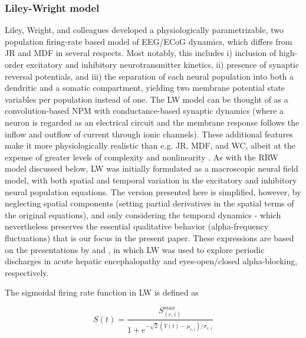\documentclass[12pt,twoside]{article}
\begin{document}
\subsubsection{Liley-Wright model}

Liley, Wright, and colleagues \citep{liley2001spatially} developed a physiologically parametrizable, two population firing-rate based model of EEG/ECoG dynamics, which differs from JR and MDF in several respects. Most notably, this includes i) inclusion of high-order excitatory and inhibitory neurotransmitter kinetics, ii) presence of synaptic reversal potentials, and iii) the separation of each neural population into both a dendritic and a somatic compartment, yielding two membrane potential state variables per population instead of one. The LW model can be thought of as a convolution-based NPM with conductance-based synaptic dynamics (where a neuron is regarded as an electrical circuit and the membrane response follows the inflow and outflow of current through ionic channels). These additional features make it more physiologically realistic than e.g. JR, MDF, and WC, albeit at the expense of greater levels of complexity and nonlinearity \citep{cook2021neural}. As with the RRW model discussed below, LW was initially formulated as a macroscopic neural field model, with both spatial and temporal variation in the excitatory and inhibitory neural population equations. The version presented here is simplified, however, by neglecting spatial components (setting partial derivatives in the spatial terms of the original equations), and only considering the temporal dynamics - which nevertheless preserves the essential qualitative behavior (alpha-frequency fluctuations) that is our focus in the present paper. These expressions are based on the presentations by \citet{song2019novel} and \citet{hartoyo2019parameter}, in which LW was used to explore periodic discharges in acute hepatic encephalopathy and eyes-open/closed alpha-blocking, respectively. 

The sigmoidal firing rate function in LW is defined as

\begin{equation}
   S(t)=\frac{S_{(e,i)}^{max}}{1+e^{-\sqrt{2} (V(t)-\mu_{e,i} )/\sigma_{e,i}}}
\end{equation}
\end{document}
